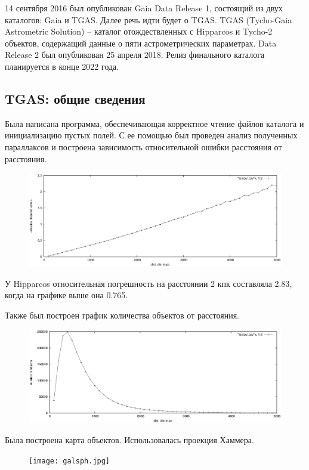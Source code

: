 \documentclass[14pt]{article} %
\begin{document}
14 сентября 2016 был опубликован Gaia Data Release 1, состоящий из двух каталогов: Gaia и TGAS. Далее речь идти будет о TGAS. TGAS (Tycho-Gaia Astrometric Solution) -- каталог отождествленных с Hipparcos и Tycho-2 объектов, содержащий данные о пяти астрометрических параметрах. Data Release 2 был опубликован 25 апреля 2018. Релиз финального каталога планируется в конце 2022 года.
\subsection{TGAS: общие сведения}
Была написана программа, обеспечивающая корректное чтение файлов каталога и инициализацию пустых полей. С ее помощью был проведен анализ полученных параллаксов и построена зависимость относительной ошибки расстояния от расстояния.
\begin{figure}[h!]
\includegraphics[width=1\linewidth]{distvserr.eps}
\end{figure}

У Hipparcos относительная погрешность на расстоянии 2 кпк составляла 2.83, когда на графике выше она 0.765.

Также был построен график количества объектов от расстояния.
\begin{figure}[h!]
\includegraphics[width=1\linewidth]{distvsN.eps}
\end{figure}\newpage

Была построена карта объектов. Использовалась проекция Хаммера.
\begin{figure}[h!]
\texttt{[image: galsph.jpg]}
\end{figure}
\end{document}
